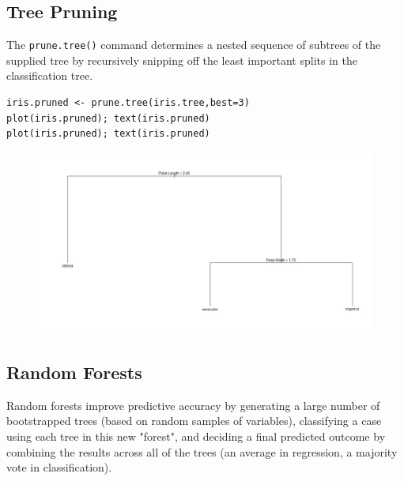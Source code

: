\documentclass[caret-main.tex]{subfiles}
\begin{document}
\subsection{Tree Pruning}
The \texttt{prune.tree()} command determines a nested sequence of subtrees
of the supplied tree by recursively snipping off the least important splits in
the classification tree.

\begin{framed}
\begin{verbatim}
iris.pruned <- prune.tree(iris.tree,best=3)
plot(iris.pruned); text(iris.pruned)
plot(iris.pruned); text(iris.pruned)
\end{verbatim}
\end{framed}
\begin{figure}[h!]
\centering
\includegraphics[width=0.9\linewidth]{./irispruned1}
\caption{}
\label{fig:irispruned1}
\end{figure}
\newpage
\subsection{Random Forests}
Random forests improve predictive accuracy by generating a large number of bootstrapped trees (based on random samples of variables), classifying a case using each tree in this new "forest", and deciding a final predicted outcome by combining the results across all of the trees (an average in regression, a majority vote in classification).
\end{document}
